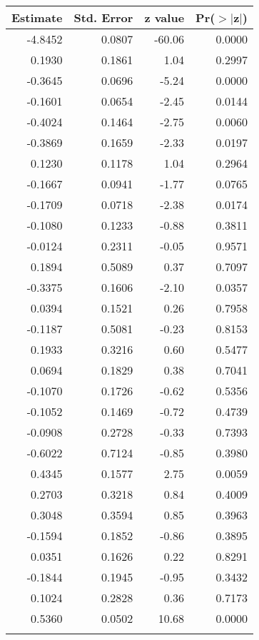 \begin{table}[ht]
\centering
\begin{tabular}{rrrr}
  \hline
Estimate & Std. Error & z value & Pr($>$$|$z$|$) \\ 
  \hline
-4.8452 & 0.0807 & -60.06 & 0.0000 \\ 
  0.1930 & 0.1861 & 1.04 & 0.2997 \\ 
  -0.3645 & 0.0696 & -5.24 & 0.0000 \\ 
  -0.1601 & 0.0654 & -2.45 & 0.0144 \\ 
  -0.4024 & 0.1464 & -2.75 & 0.0060 \\ 
  -0.3869 & 0.1659 & -2.33 & 0.0197 \\ 
  0.1230 & 0.1178 & 1.04 & 0.2964 \\ 
  -0.1667 & 0.0941 & -1.77 & 0.0765 \\ 
  -0.1709 & 0.0718 & -2.38 & 0.0174 \\ 
  -0.1080 & 0.1233 & -0.88 & 0.3811 \\ 
  -0.0124 & 0.2311 & -0.05 & 0.9571 \\ 
  0.1894 & 0.5089 & 0.37 & 0.7097 \\ 
  -0.3375 & 0.1606 & -2.10 & 0.0357 \\ 
  0.0394 & 0.1521 & 0.26 & 0.7958 \\ 
  -0.1187 & 0.5081 & -0.23 & 0.8153 \\ 
  0.1933 & 0.3216 & 0.60 & 0.5477 \\ 
  0.0694 & 0.1829 & 0.38 & 0.7041 \\ 
  -0.1070 & 0.1726 & -0.62 & 0.5356 \\ 
  -0.1052 & 0.1469 & -0.72 & 0.4739 \\ 
  -0.0908 & 0.2728 & -0.33 & 0.7393 \\ 
  -0.6022 & 0.7124 & -0.85 & 0.3980 \\ 
  0.4345 & 0.1577 & 2.75 & 0.0059 \\ 
  0.2703 & 0.3218 & 0.84 & 0.4009 \\ 
  0.3048 & 0.3594 & 0.85 & 0.3963 \\ 
  -0.1594 & 0.1852 & -0.86 & 0.3895 \\ 
  0.0351 & 0.1626 & 0.22 & 0.8291 \\ 
  -0.1844 & 0.1945 & -0.95 & 0.3432 \\ 
  0.1024 & 0.2828 & 0.36 & 0.7173 \\ 
  0.5360 & 0.0502 & 10.68 & 0.0000 \\ 
$$
\end{tabular}
\end{table}
